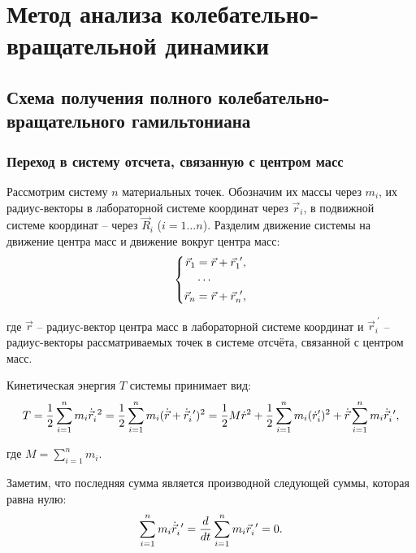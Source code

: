 \section{Метод анализа колебательно-вращательной динамики}
\subsection{Схема получения полного колебательно-вращательного гамильтониана}
\subsubsection{Переход в систему отсчета, связанную с центром масс}

\hspace{0.48cm} Рассмотрим систему $n$ материальных точек. Обозначим их массы через $m_i$, их радиус-векторы в лабораторной системе координат через $\vec{r}_i$, в подвижной системе координат -- через $\vec{R}_i$ ($i = 1 \dots n$). Разделим движение системы на движение центра масс и движение вокруг центра масс:
\vspace*{-0.1cm}
\begin{gather}
\left\{
\begin{aligned}
\vec{r}_1 &= \vec{r} + \vec{r}_1^{\ \prime}, \\
&\cdots \\
\vec{r}_n &= \vec{r} + \vec{r}_n^{\ \prime},
\end{aligned}
\right. \notag
\end{gather}

\hspace*{-0.75cm} где $\vec{r}$ -- радиус-вектор центра масс в лабораторной системе координат и $\vec{r}_i^{\ \prime}$ -- радиус-векторы рассматриваемых точек в системе отсчёта, связанной с центром масс.

Кинетическая энергия $T$ системы принимает вид: 
\vspace*{-0.1cm}
\begin{gather}
T = \frac{1}{2} \sum_{i=1}^{n} m_i \dot{\vec{r}}_i^{\ 2} = \frac{1}{2} \sum_{i=1}^{n} m_i (\dot{\vec{r}} + \dot{\vec{r}}_i^{\ \prime})^2  = \frac{1}{2} M \dot{r}^2 + \frac{1}{2} \sum_{i=1}^{n} m_i ( \dot{r}_i^\prime)^2 + \dot{\vec{r}} \sum_{i=1}^{n} m_i \dot{\vec{r}}_i^{\ \prime}, \notag
\end{gather}

\hspace*{-0.75cm} где $M = \sum_{i=1}^{n} m_i$.

Заметим, что последняя сумма является производной следующей суммы, которая равна нулю: 
\vspace*{-0.1cm}
\begin{gather}
\sum_{i=1}^{n} m_i \dot{\vec{r}}_i^{\ \prime} = \frac{d}{dt} \sum_{i=1}^{n} m_i \vec{r}_i^{\ \prime} = 0. \notag
\end{gather}

